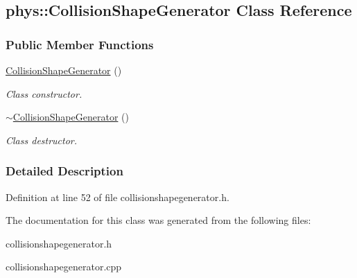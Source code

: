 \hypertarget{classphys_1_1CollisionShapeGenerator}{
\subsection{phys::CollisionShapeGenerator Class Reference}
\label{d1/d0e/classphys_1_1CollisionShapeGenerator}
}
\subsubsection*{Public Member Functions}
\begin{DoxyCompactItemize}
\item 
\hypertarget{classphys_1_1CollisionShapeGenerator_a0d7537a7fcc47042edaccc3c30b02509}{
\hyperlink{classphys_1_1CollisionShapeGenerator_a0d7537a7fcc47042edaccc3c30b02509}{CollisionShapeGenerator} ()}
\label{d1/d0e/classphys_1_1CollisionShapeGenerator_a0d7537a7fcc47042edaccc3c30b02509}

\begin{DoxyCompactList}\small\item\em Class constructor. \item\end{DoxyCompactList}\item 
\hypertarget{classphys_1_1CollisionShapeGenerator_a8c9289e5b8dda2e54d59feeece0645e3}{
\hyperlink{classphys_1_1CollisionShapeGenerator_a8c9289e5b8dda2e54d59feeece0645e3}{$\sim$CollisionShapeGenerator} ()}
\label{d1/d0e/classphys_1_1CollisionShapeGenerator_a8c9289e5b8dda2e54d59feeece0645e3}

\begin{DoxyCompactList}\small\item\em Class destructor. \item\end{DoxyCompactList}\end{DoxyCompactItemize}


\subsubsection{Detailed Description}


Definition at line 52 of file collisionshapegenerator.h.



The documentation for this class was generated from the following files:\begin{DoxyCompactItemize}
\item 
collisionshapegenerator.h\item 
collisionshapegenerator.cpp\end{DoxyCompactItemize}
